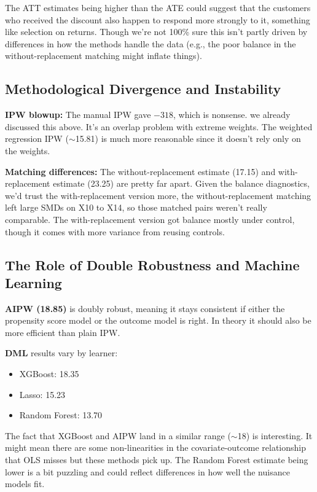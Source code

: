 \documentclass[12pt,a4paper]{article}
\begin{document}
The ATT estimates being higher than the ATE could suggest that the customers who received the discount also happen to respond more strongly to it, something like selection on returns. Though we're not 100\% sure this isn't partly driven by differences in how the methods handle the data (e.g., the poor balance in the without-replacement matching might inflate things).

\subsection{Methodological Divergence and Instability}

\textbf{IPW blowup:} The manual IPW gave $-318$, which is nonsense. we already discussed this above. It's an overlap problem with extreme weights. The weighted regression IPW ($\sim$15.81) is much more reasonable since it doesn't rely only on the weights.

\textbf{Matching differences:} The without-replacement estimate (17.15) and with-replacement estimate (23.25) are pretty far apart. Given the balance diagnostics, we'd trust the with-replacement version more, the without-replacement matching left large SMDs on X10 to X14, so those matched pairs weren't really comparable. The with-replacement version got balance mostly under control, though it comes with more variance from reusing controls.

\subsection{The Role of Double Robustness and Machine Learning}

\textbf{AIPW (18.85)} is doubly robust, meaning it stays consistent if either the propensity score model or the outcome model is right. In theory it should also be more efficient than plain IPW.

\textbf{DML} results vary by learner:
\begin{itemize}
\item XGBoost: 18.35
\item Lasso: 15.23
\item Random Forest: 13.70
\end{itemize}

The fact that XGBoost and AIPW land in a similar range ($\sim$18) is interesting. It might mean there are some non-linearities in the covariate-outcome relationship that OLS misses but these methods pick up. The Random Forest estimate being lower is a bit puzzling and could reflect differences in how well the nuisance models fit.
\end{document}

